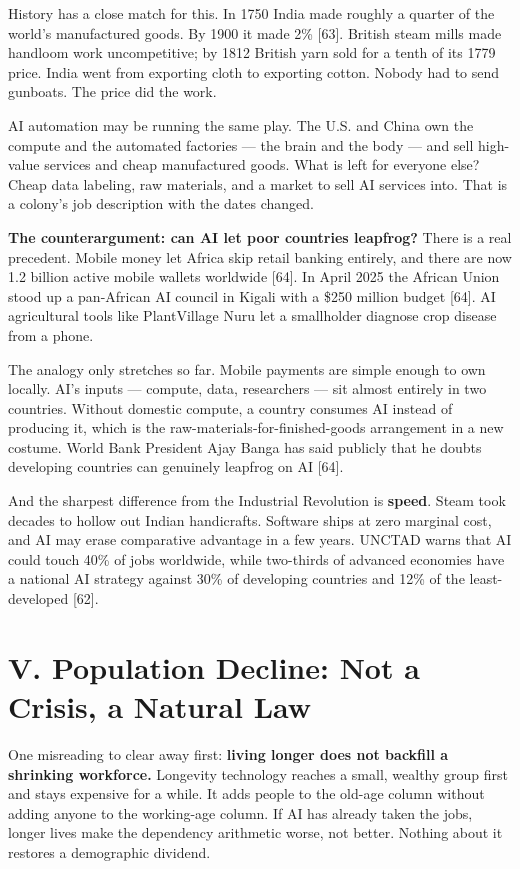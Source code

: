 \documentclass[11pt,a4paper]{article}
\begin{document}
History has a close match for this. In 1750 India made roughly a quarter of the world's manufactured goods. By 1900 it made 2\% [63]. British steam mills made handloom work uncompetitive; by 1812 British yarn sold for a tenth of its 1779 price. India went from exporting cloth to exporting cotton. Nobody had to send gunboats. The price did the work.

AI automation may be running the same play. The U.S. and China own the compute and the automated factories --- the brain and the body --- and sell high-value services and cheap manufactured goods. What is left for everyone else? Cheap data labeling, raw materials, and a market to sell AI services into. That is a colony's job description with the dates changed.

\textbf{The counterargument: can AI let poor countries leapfrog?} There is a real precedent. Mobile money let Africa skip retail banking entirely, and there are now 1.2 billion active mobile wallets worldwide [64]. In April 2025 the African Union stood up a pan-African AI council in Kigali with a \$250 million budget [64]. AI agricultural tools like PlantVillage Nuru let a smallholder diagnose crop disease from a phone.

The analogy only stretches so far. Mobile payments are simple enough to own locally. AI's inputs --- compute, data, researchers --- sit almost entirely in two countries. Without domestic compute, a country consumes AI instead of producing it, which is the raw-materials-for-finished-goods arrangement in a new costume. World Bank President Ajay Banga has said publicly that he doubts developing countries can genuinely leapfrog on AI [64].

And the sharpest difference from the Industrial Revolution is \textbf{speed}. Steam took decades to hollow out Indian handicrafts. Software ships at zero marginal cost, and AI may erase comparative advantage in a few years. UNCTAD warns that AI could touch 40\% of jobs worldwide, while two-thirds of advanced economies have a national AI strategy against 30\% of developing countries and 12\% of the least-developed [62].

\section{V. Population Decline: Not a Crisis, a Natural Law}

One misreading to clear away first: \textbf{living longer does not backfill a shrinking workforce.} Longevity technology reaches a small, wealthy group first and stays expensive for a while. It adds people to the old-age column without adding anyone to the working-age column. If AI has already taken the jobs, longer lives make the dependency arithmetic worse, not better. Nothing about it restores a demographic dividend.
\end{document}
